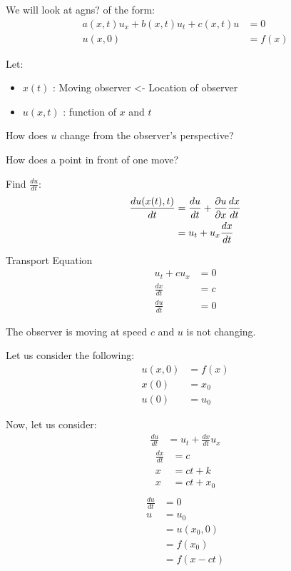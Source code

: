 \documentclass{article}
\begin{document}
We will look at agns? of the form:
%
\begin{align}
  a(x, t) u_x + b(x, t) u_t + c(x, t) u & = 0\\
  u(x, 0) & = f(x)
\end{align}

Let:
%
\begin{itemize}
  \item $x(t)$ : Moving observer <- Location of observer
  \item $u(x, t)$ : function of $x$ and $t$
\end{itemize}

How does $u$ change from the observer's perspective?

How does a point in front of one move?

Find $\frac{du}{dt}$:
%
\begin{align}
  \frac{du(x(t), t)}{dt} & = \frac{du}{dt} + \frac{\partial u}{\partial x} \frac{dx}{dt}\\
  & = u_t + u_x \frac{dx}{dt}
\end{align}

\ex Transport Equation
%
\begin{align}
  u_t + cu_x & = 0\\
  \frac{dx}{dt} & = c\\
  \frac{du}{dt} & = 0
\end{align}

The observer is moving at speed $c$ and $u$ is not changing.

Let us consider the following:
%
\begin{align}
  u(x, 0) & = f(x)\\
  x(0) & = x_0\\
  u(0) & = u_0
\end{align}

Now, let us consider:
%
\begin{align}
  \frac{du}{dt} & = u_t + \frac{dx}{dt} u_x
\end{align}
\begin{align}
  \frac{dx}{dt} & = c\\
  x & = ct + k\\
  x & = ct + x_0\\
\end{align}
\begin{align}
  \frac{du}{dt} & = 0\\
  u & = u_0\\ & = u(x_0, 0)\\ & = f(x_0)\\ & = f(x - ct)
\end{align}
\end{document}
